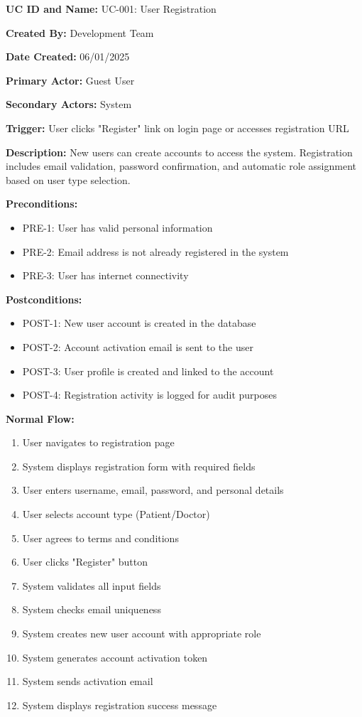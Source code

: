 \documentclass[12pt,a4paper]{article}
\begin{document}
\textbf{UC ID and Name:} UC-001: User Registration

\textbf{Created By:} Development Team

\textbf{Date Created:} 06/01/2025

\textbf{Primary Actor:} Guest User

\textbf{Secondary Actors:} System

\textbf{Trigger:} User clicks "Register" link on login page or accesses registration URL

\textbf{Description:} New users can create accounts to access the system. Registration includes email validation, password confirmation, and automatic role assignment based on user type selection.

\textbf{Preconditions:}
\begin{itemize}
\item PRE-1: User has valid personal information
\item PRE-2: Email address is not already registered in the system
\item PRE-3: User has internet connectivity
\end{itemize}

\textbf{Postconditions:}
\begin{itemize}
\item POST-1: New user account is created in the database
\item POST-2: Account activation email is sent to the user
\item POST-3: User profile is created and linked to the account
\item POST-4: Registration activity is logged for audit purposes
\end{itemize}

\textbf{Normal Flow:}
\begin{enumerate}
\item User navigates to registration page
\item System displays registration form with required fields
\item User enters username, email, password, and personal details
\item User selects account type (Patient/Doctor)
\item User agrees to terms and conditions
\item User clicks "Register" button
\item System validates all input fields
\item System checks email uniqueness
\item System creates new user account with appropriate role
\item System generates account activation token
\item System sends activation email
\item System displays registration success message
\end{enumerate}
\end{document}
